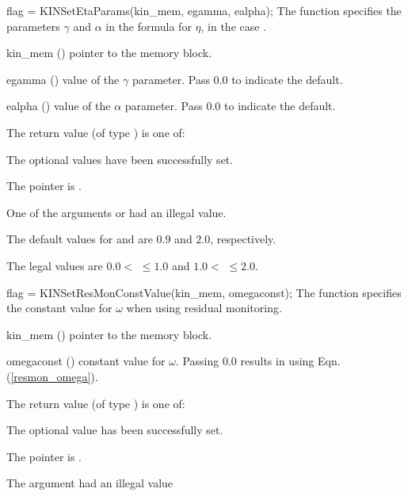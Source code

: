 {
flag = KINSetEtaParams(kin\_mem, egamma, ealpha);
}
{
  The function  specifies the parameters $\gamma$ and
  $\alpha$ in the formula for $\eta$, in the case .
}
{
  \begin{args}
  \item[kin\_mem] ()
    pointer to the {\kinsol} memory block.
  \item[egamma] ()
    value of the $\gamma$ parameter.  Pass $0.0$ to indicate the default.
  \item[ealpha] ()
    value of the $\alpha$ parameter.  Pass $0.0$ to indicate the default.
  \end{args}
}
{
  The return value  (of type ) is one of:
  \begin{args}
  \item[\Id{KIN\_SUCCESS}] 
    The optional values have been successfully set.
  \item[\Id{KIN\_MEM\_NULL}]
    The  pointer is .
  \item[\Id{KIN\_ILL\_INPUT}]
    One of the arguments  or  had an illegal value.
  \end{args}
}
{
  The default values for  and  are $0.9$ and $2.0$, respectively.

  The legal values are $0.0 <$  $\le 1.0$ and
  $1.0<$  $\le 2.0$. 
}
{
flag = KINSetResMonConstValue(kin\_mem, omegaconst);
}
{
  The function  specifies the constant value
  for $\omega$ when using residual monitoring.
}
{
  \begin{args}
  \item[kin\_mem] ()
    pointer to the {\kinsol} memory block.
  \item[omegaconst] ()
    constant value for $\omega$.  Passing $0.0$ results in using
    Eqn. (\ref{resmon_omega}).
  \end{args}
}
{
  The return value  (of type ) is one of:
  \begin{args}
  \item[\Id{KIN\_SUCCESS}] 
    The optional value has been successfully set.
  \item[\Id{KIN\_MEM\_NULL}]
    The  pointer is .
  \item[\Id{KIN\_ILL\_INPUT}]
    The argument  had an illegal value
  \end{args}
}
